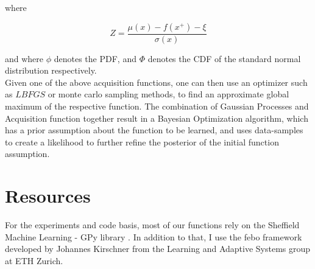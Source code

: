 where

\begin{equation}
    Z = \frac{\mu (x) - f(x^+) - \xi}{\sigma(x)}
\end{equation}

and where $\phi$ denotes the PDF, and $\Phi$ denotes the CDF of the standard normal distribution respectively. \\

Given one of the above acquisition functions, one can then use an optimizer such as $LBFGS$ or monte carlo sampling methods, to find an approximate global maximum of the respective function.
The combination of Gaussian Processes and Acquisition function together result in a Bayesian Optimization algorithm, which has a prior assumption about the function to be learned, and uses data-samples to create a likelihood to further refine the posterior of the initial function assumption.

\section{Resources}
For the experiments and code basis, most of our functions rely on the Sheffield Machine Learning - GPy library \citep{gpy2014}.
In addition to that, I use the febo framework developed by Johannes Kirschner from the Learning and Adaptive Systems group at ETH Zurich.